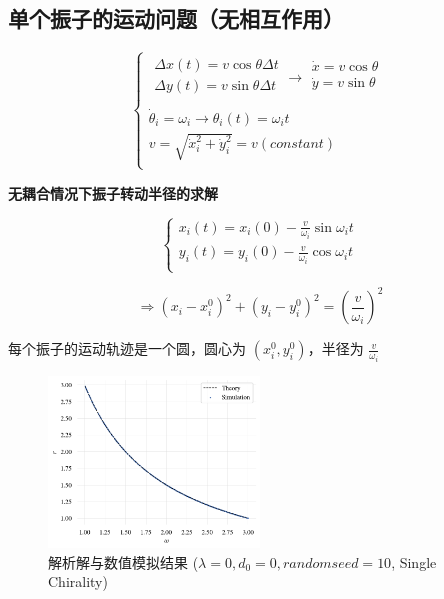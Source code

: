 \documentclass{article}
\begin{document}
\subsection{单个振子的运动问题（无相互作用）}

$$
\begin{cases}
	\begin{array}{c}
	\Delta x\left( t \right) =v\cos \theta \Delta t\\
	\Delta y\left( t \right) =v\sin \theta \Delta t\\
\end{array}\rightarrow \begin{array}{c}
	\dot{x}=v\cos \theta\\
	\dot{y}=v\sin \theta\\
\end{array}\\
	\dot{\theta}_i=\omega _i\rightarrow \theta _i\left( t \right) =\omega _it\\
	v=\sqrt{\dot{x}_{i}^{2}+\dot{y}_{i}^{2}}=v\left( constant \right)\\
\end{cases}
$$

\textbf{无耦合情况下振子转动半径的求解}

$$
\begin{cases}
	x_i\left( t \right) =x_i\left( 0 \right) -\frac{v}{\omega _i}\sin \omega _it\\
	y_i\left( t \right) =y_i\left( 0 \right) -\frac{v}{\omega _i}\cos \omega _it\\
\end{cases}
$$

$$
\Rightarrow \left( x_i-x_{i}^{0} \right) ^2+\left( y_i-y_{i}^{0} \right) ^2=\left( \frac{v}{\omega _i} \right) ^2
$$

每个振子的运动轨迹是一个圆，圆心为 $\left( x_i^0,y_i^0 \right)$，半径为 $\frac{v}{\omega _i}$

\begin{figure}[H]
	\centering
	\includegraphics[width=0.5\textwidth]{./figs/noCouplingRadius.png}
	\caption{解析解与数值模拟结果 ($\lambda=0, d_0=0, random seed=10$, Single Chirality)}
	\label{fig:fig21.1}
\end{figure}
\end{document}
